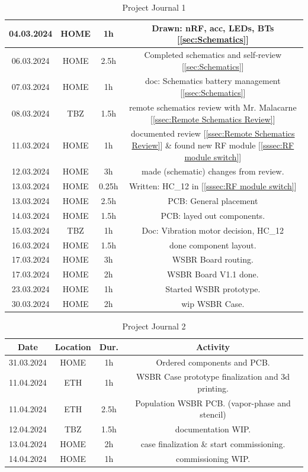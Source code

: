 \begin{table}[H]
\begin{tabular}{||c | c | c || c||}
 \hline
    04.03.2024 & HOME & 1h & Drawn: nRF, acc, LEDs, BTs [\ref{sec:Schematics}] \\ 
 \hline
    06.03.2024 & HOME & 2.5h & Completed schematics and self-review [\ref{sec:Schematics}] \\ 
 \hline
    07.03.2024 & HOME & 1h & doc: Schematics battery management [\ref{ssec:Schematics}] \\ 
 \hline
     08.03.2024 & TBZ & 1.5h & remote schematics review with Mr. Malacarne [\ref{ssec:Remote Schematics Review}] \\ 
 \hline
     11.03.2024 & HOME & 1h & documented review [\ref{ssec:Remote Schematics Review}] \& found new RF module [\ref{sssec:RF module switch}] \\ 
 \hline
     12.03.2024 & HOME & 3h & made (schematic) changes from review. \\ 
 \hline
     13.03.2024 & HOME & 0.25h & Written: HC\_12 in [\ref{sssec:RF module switch}] \\ 
 \hline
     13.03.2024 & HOME & 2.5h & PCB: General placement \\ 
 \hline
     14.03.2024 & HOME & 1.5h & PCB: layed out components. \\ 
 \hline
     15.03.2024 & TBZ & 1h & Doc: Vibration motor decision, HC\_12\\ 
 \hline
     16.03.2024 & HOME & 1.5h & done component layout. \\ 
 \hline
     17.03.2024 & HOME & 3h & WSBR Board routing. \\ 
 \hline
     17.03.2024 & HOME & 2h & WSBR Board V1.1 done. \\ 
 \hline
     23.03.2024 & HOME & 1h & Started WSBR prototype. \\ 
 \hline
     30.03.2024 & HOME & 2h & wip WSBR Case. \\ 
 \hline
\end{tabular}
    \caption{Project Journal 1}
    \label{tab:Project Journal 1}
\end{table}




\begin{table}[H]
    \centering
\begin{tabular}{||c | c | c || c||} 
 \hline
 Date &  Location & Dur. & Activity \\ [0.5ex] 
 \hline\hline
     31.03.2024 & HOME & 1h & Ordered components and PCB. \\ 
 \hline
     11.04.2024 & ETH & 1h & WSBR Case prototype finalization and 3d printing. \\ 
 \hline
     11.04.2024 & ETH & 2.5h & Population WSBR PCB. (vapor-phase and stencil)\\ 
 \hline
     12.04.2024 & TBZ & 1.5h & documentation WIP. \\ 
 \hline
     13.04.2024 & HOME & 2h & case finalization \& start commissioning. \\ 
 \hline
     14.04.2024 & HOME & 1h & commissioning WIP. \\ 
 \hline
\end{tabular}
    \caption{Project Journal 2}
    \label{tab:Project Journal 2}
\end{table}
